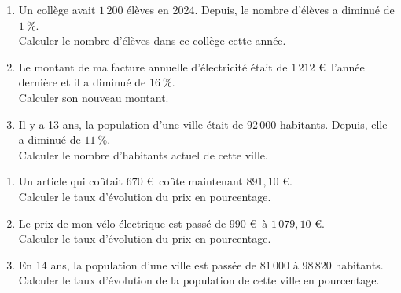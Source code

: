 {%
\begin{Exercice}
\leavevmode\vspace{-\baselineskip}
\begin{enumerate}
	\item Un collège avait $1\,200$ élèves en 2024. Depuis, le nombre d'élèves a diminué de $1~\%$. \\
                Calculer le nombre d'élèves dans ce collège cette année.
	\item Le montant de ma facture annuelle d'électricité était de $1\,212$ €~l'année dernière et il a diminué de $16~\%$. \\
                Calculer son nouveau montant.
	\item Il y a 13 ans, la population d'une ville était de $92\,000$ habitants. Depuis, elle a diminué de $11~\%$.\\
                 Calculer le nombre d'habitants actuel de cette ville.
\end{enumerate}
\end{Exercice}

\begin{Exercice}
\leavevmode\vspace{-\baselineskip}
\begin{enumerate}
	\item Un article qui coûtait $670$ €~coûte maintenant $891{,}10$ €.\\
                 Calculer le taux d'évolution du prix en pourcentage.
	\item Le prix de mon vélo électrique est passé de $990$ €~à $1\,079{,}10$ €.\\
                 Calculer le taux d'évolution du prix en pourcentage.
	\item En 14 ans, la population d'une ville est passée de $81\,000$ à $98\,820$ habitants.\\
                 Calculer le taux d'évolution de la population de cette ville en pourcentage.
\end{enumerate}
\end{Exercice}

}
